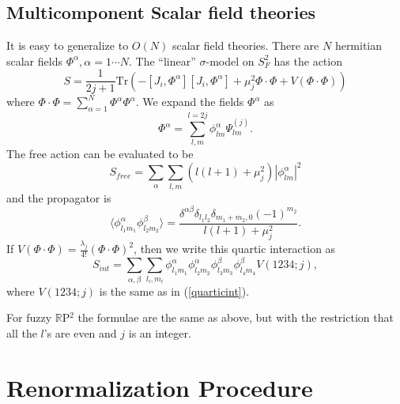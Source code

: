 \documentclass[a4paper,12pt]{article}
\numberwithin{equation}{section}
\begin{document}
\subsection{Multicomponent Scalar field theories}
It is easy to generalize to $O(N)$ scalar field theories. There are
$N$ hermitian scalar fields $\Phi^\alpha, \alpha=1 \cdots N$. The
``linear'' $\sigma$-model on $S_F^2$ has the action
\begin{equation} 
S = \frac{1}{2j+1} \text{Tr}\left(- [J_i, \Phi^\alpha][J_i, \Phi^\alpha] +
\mu_j^2 \Phi \cdot \Phi + V(\Phi \cdot \Phi)\right)
\end{equation} 
where $\Phi \cdot \Phi = \sum_{\alpha=1}^N \Phi^\alpha
\Phi^\alpha$. We expand the fields $\Phi^\alpha$ as
\begin{equation} 
\Phi^\alpha = \sum_{l,m}^{l=2j} \phi^\alpha_{lm} \Psi^{(j)}_{lm}.
\end{equation} 
The free action can be evaluated to be
\begin{equation} 
S_{free} = \sum_{\alpha} \sum_{l,m} (l(l+1)+\mu_j^2)|\phi^\alpha_{lm}|^2  
\end{equation} 
and the propagator is
\begin{equation} 
\langle \phi^\alpha_{l_1 m_1} \phi^\beta_{l_2 m_2}\rangle =
\frac{\delta^{\alpha \beta} \delta_{l_1 l_2} \delta_{m_1 + m_2, 0}
(-1)^{m_2}}{l(l+1) + \mu_j^2}.  
\end{equation} 
If $V(\Phi \cdot \Phi) = \frac{\lambda_j}{4!}(\Phi \cdot \Phi)^2$,
then we write this quartic interaction as
\begin{equation}
S_{int} =  \sum_{\alpha,\beta} \sum_{l_i,m_i}\phi^\alpha_{l_1
m_1}\phi^\alpha_{l_2 m_2}\phi^\beta_{l_3 m_3}\phi^\beta_{l_4 m_4}
V(1234;j),  
\end{equation} 
where $V(1234;j)$ is the same as in (\ref{quarticint}).

For fuzzy ${\mathbb R}$P$^2$ the formulae are the same as above, but
with the restriction that all the $l$'s are even and $j$ is an
integer.

\section{Renormalization Procedure}
\end{document}
